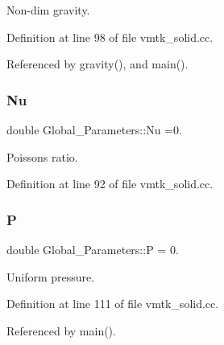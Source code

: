 Non-\/dim gravity. 



Definition at line 98 of file vmtk\+\_\+solid.\+cc.



Referenced by gravity(), and main().

\mbox{\label{namespaceGlobal__Parameters_a20fccdcfa2c15ad8b951b9ada3bb1661}} 
\subsubsection{\texorpdfstring{Nu}{Nu}}
{\footnotesize\ttfamily double Global\+\_\+\+Parameters\+::\+Nu =0.}



Poisson\textquotesingle{}s ratio. 



Definition at line 92 of file vmtk\+\_\+solid.\+cc.

\mbox{\label{namespaceGlobal__Parameters_a31fb55c20db4aa0127aafa20f0d76731}} 
\subsubsection{\texorpdfstring{P}{P}}
{\footnotesize\ttfamily double Global\+\_\+\+Parameters\+::P = 0.}



Uniform pressure. 



Definition at line 111 of file vmtk\+\_\+solid.\+cc.



Referenced by main().

